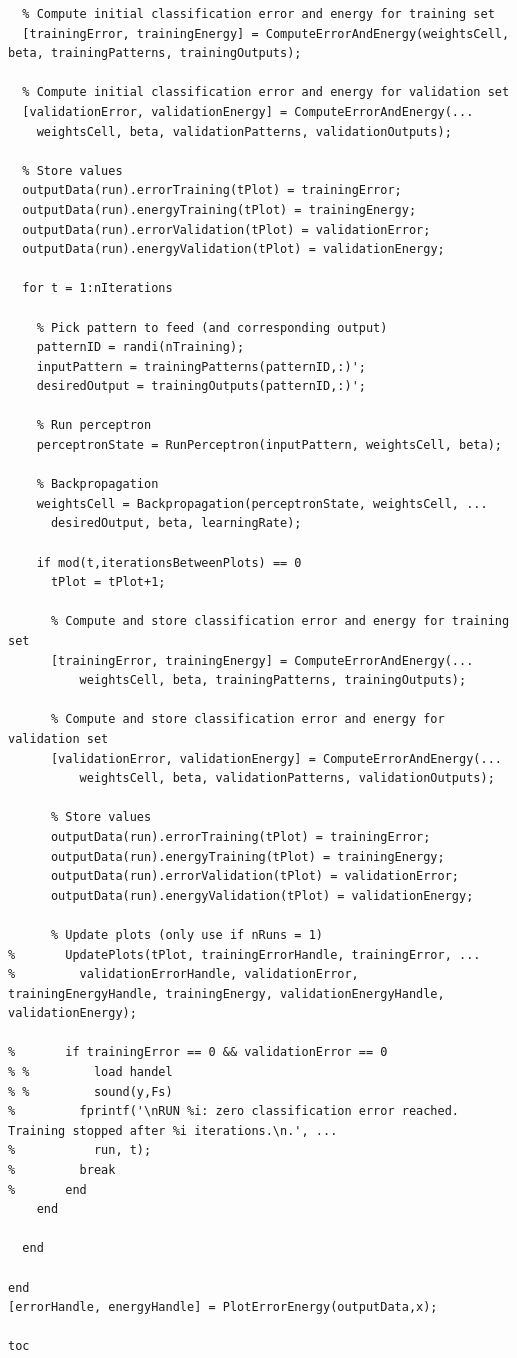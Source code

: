\documentclass[12pt,titlepage]{article}
\begin{document}
\begin{lstlisting}
  % Compute initial classification error and energy for training set
  [trainingError, trainingEnergy] = ComputeErrorAndEnergy(weightsCell, beta, trainingPatterns, trainingOutputs);
    
  % Compute initial classification error and energy for validation set
  [validationError, validationEnergy] = ComputeErrorAndEnergy(...
    weightsCell, beta, validationPatterns, validationOutputs);
      
  % Store values
  outputData(run).errorTraining(tPlot) = trainingError;
  outputData(run).energyTraining(tPlot) = trainingEnergy;
  outputData(run).errorValidation(tPlot) = validationError;
  outputData(run).energyValidation(tPlot) = validationEnergy;
  
  for t = 1:nIterations
    
    % Pick pattern to feed (and corresponding output)
    patternID = randi(nTraining);
    inputPattern = trainingPatterns(patternID,:)';
    desiredOutput = trainingOutputs(patternID,:)';
  
    % Run perceptron
    perceptronState = RunPerceptron(inputPattern, weightsCell, beta);
  
    % Backpropagation
    weightsCell = Backpropagation(perceptronState, weightsCell, ...
      desiredOutput, beta, learningRate);

    if mod(t,iterationsBetweenPlots) == 0
      tPlot = tPlot+1;

      % Compute and store classification error and energy for training set
      [trainingError, trainingEnergy] = ComputeErrorAndEnergy(...
          weightsCell, beta, trainingPatterns, trainingOutputs);
    
      % Compute and store classification error and energy for validation set
      [validationError, validationEnergy] = ComputeErrorAndEnergy(...
          weightsCell, beta, validationPatterns, validationOutputs);
      
      % Store values
      outputData(run).errorTraining(tPlot) = trainingError;
      outputData(run).energyTraining(tPlot) = trainingEnergy;
      outputData(run).errorValidation(tPlot) = validationError;
      outputData(run).energyValidation(tPlot) = validationEnergy;
      
      % Update plots (only use if nRuns = 1)
%       UpdatePlots(tPlot, trainingErrorHandle, trainingError, ...
%         validationErrorHandle, validationError, trainingEnergyHandle, trainingEnergy, validationEnergyHandle, validationEnergy);

%       if trainingError == 0 && validationError == 0
% %         load handel
% %         sound(y,Fs)
%         fprintf('\nRUN %i: zero classification error reached. Training stopped after %i iterations.\n.', ...
%           run, t);
%         break
%       end
    end
    
  end
  
end
[errorHandle, energyHandle] = PlotErrorEnergy(outputData,x);

toc
\end{lstlisting}
\end{document}
